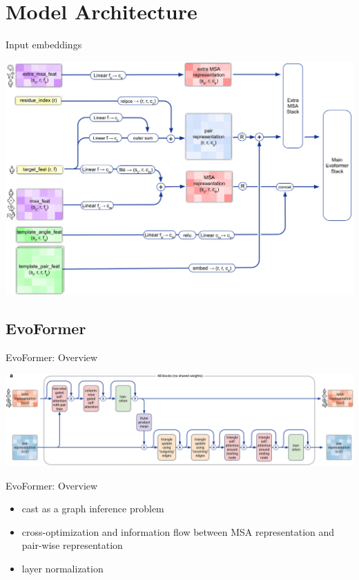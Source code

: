 \documentclass[presentation, smaller]{beamer}
\begin{document}
\section*{Model Architecture}
\label{sec:org75d8915}
\begin{frame}[label={sec:orgc31605c}]{Input embeddings \cite{jumperHighlyAccurateProtein2021}}
\begin{center}
\includegraphics[height=\textheight]{./imgs/input_embeddings.png}
\end{center}
\cite{jumperHighlyAccurateProtein2021}
\end{frame}
\subsection*{EvoFormer}
\label{sec:orga028468}
\begin{frame}[label={sec:orge6ac59d}]{EvoFormer: Overview \cite{jumperHighlyAccurateProtein2021}}
\begin{center}
\includegraphics[width=.9\linewidth]{./imgs/model-evoformer-main.png}
\end{center} 
\end{frame}

\begin{frame}[label={sec:org8063773}]{EvoFormer: Overview \cite{jumperHighlyAccurateProtein2021}}
\begin{itemize}
\item cast as a graph inference problem
\item cross-optimization and information flow between MSA representation and pair-wise representation
\item layer normalization
\end{itemize}
\end{frame}
\end{document}
